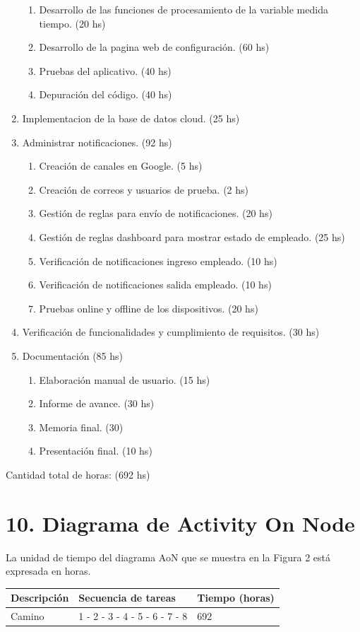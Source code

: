 \documentclass[
11pt, %
]{charter}
\begin{document}
\begin{enumerate}
\begin{enumerate}
	\item Desarrollo de las funciones de procesamiento de la variable medida tiempo. (20 hs)
	\item Desarrollo de la pagina web de configuración. (60 hs)
	\item Pruebas del aplicativo. (40 hs)
	\item Depuración del código. (40 hs)
	\end{enumerate}
\item Implementacion de la base de datos cloud. (25 hs)
\item Administrar notificaciones. (92 hs)
	\begin{enumerate}
	\item Creación de canales en Google. (5 hs)
	\item Creación de correos y usuarios de prueba. (2 hs)
	\item Gestión de reglas para envío de notificaciones. (20 hs)
	\item Gestión de reglas dashboard para mostrar estado de empleado. (25 hs)
	\item Verificación de notificaciones ingreso empleado. (10 hs)
	\item Verificación de notificaciones salida empleado. (10 hs)
	\item Pruebas online y offline de los dispositivos. (20 hs)
	\end{enumerate}
\item Verificación de funcionalidades y cumplimiento de requisitos. (30 hs)
\item Documentación (85 hs)
	\begin{enumerate}
	\item Elaboración manual de usuario. (15 hs)
	\item Informe de avance. (30 hs)
	\item Memoria final. (30)
	\item Presentación final. (10 hs)
	\end{enumerate}
\end{enumerate}
Cantidad total de horas: (692 hs)


\section{10. Diagrama de Activity On Node}
\label{sec:AoN}

La unidad de tiempo del diagrama AoN que se muestra en la Figura 2 está expresada en horas.

\begin{table}[H]
 \begin{tabular}{|l|l|l|}
\hline
\rowcolor[HTML]{C0C0C0} 
\textbf{Descripción} & \textbf{Secuencia de tareas} & \textbf{Tiempo (horas)} \\ \hline
Camino & 1 - 2 - 3 - 4 - 5 - 6 - 7 - 8 & 692	\\ \hline

\end{tabular}
\end{table}
\end{document}
